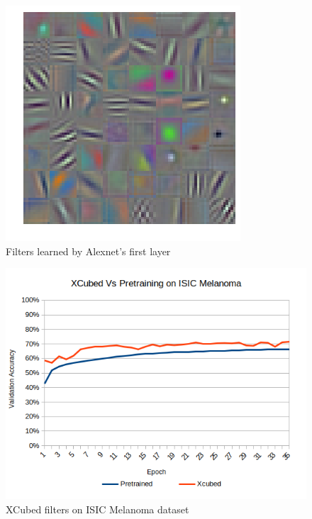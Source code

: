 \documentclass[twocolumn]{article}
\begin{document}
\begin{figure}[!htb]
    \centering
    \includegraphics[width=.8\linewidth]{trainedfet}
    \caption{Filters learned by Alexnet's first layer}
    \label{fig:learnedweights}
\end{figure}
\begin{figure}[!htb]
    \centering
    \includegraphics[width=.8\linewidth]{x3vpretrained}
    \caption{XCubed filters on ISIC Melanoma dataset}
    \label{fig:melanomacompare}
\end{figure}
\end{document}
